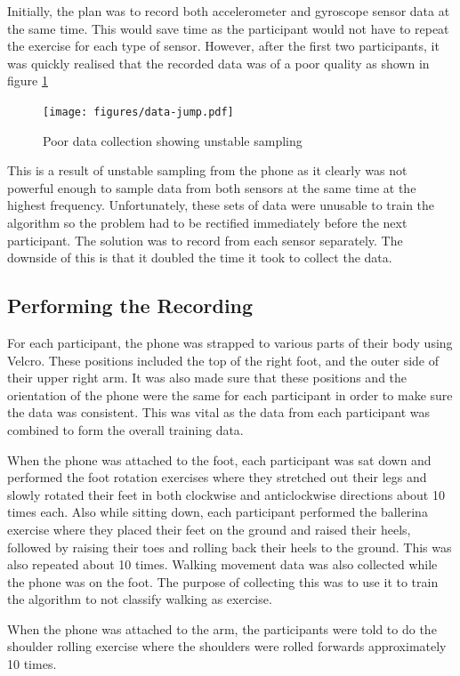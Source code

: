 Initially, the plan was to record both accelerometer and gyroscope sensor data at the same time. This would save time as the participant would not have to repeat the exercise for each type of sensor. However, after the first two participants, it was quickly realised that the recorded data was of a poor quality as shown in figure \ref{fig:bad-data}

\begin{figure}
	\centering
	\texttt{[image: figures/data-jump.pdf]}
	\caption{Poor data collection showing unstable sampling\label{fig:bad-data}}
\end{figure}

This is a result of unstable sampling from the phone as it clearly was not powerful enough to sample data from both sensors at the same time at the highest frequency. Unfortunately, these sets of data were unusable to train the algorithm so the problem had to be rectified immediately before the next participant. The solution was to record from each sensor separately. The downside of this is that it doubled the time it took to collect the data.

\subsection{Performing the Recording}
For each participant, the phone was strapped to various parts of their body using Velcro. These positions included the top of the right foot, and the outer side of their upper right arm. It was also made sure that these positions and the orientation of the phone were the same for each participant in order to make sure the data was consistent. This was vital as the data from each participant was combined to form the overall training data.

When the phone was attached to the foot, each participant was sat down and performed the foot rotation exercises where they stretched out their legs and slowly rotated their feet in both clockwise and anticlockwise directions about 10 times each. Also while sitting down, each participant performed the ballerina exercise where they placed their feet on the ground and raised their heels, followed by raising their toes and rolling back their heels to the ground. This was also repeated about 10 times. Walking movement data was also collected while the phone was on the foot. The purpose of collecting this was to use it to train the algorithm to not classify walking as exercise.

When the phone was attached to the arm, the participants were told to do the shoulder rolling exercise where the shoulders were rolled forwards approximately 10 times.

